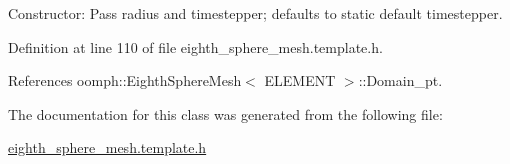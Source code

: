 Constructor\+: Pass radius and timestepper; defaults to static default timestepper. 



Definition at line 110 of file eighth\+\_\+sphere\+\_\+mesh.\+template.\+h.



References oomph\+::\+Eighth\+Sphere\+Mesh$<$ E\+L\+E\+M\+E\+N\+T $>$\+::\+Domain\+\_\+pt.



The documentation for this class was generated from the following file\+:\begin{DoxyCompactItemize}
\item 
\hyperlink{eighth__sphere__mesh_8template_8h}{eighth\+\_\+sphere\+\_\+mesh.\+template.\+h}\end{DoxyCompactItemize}
